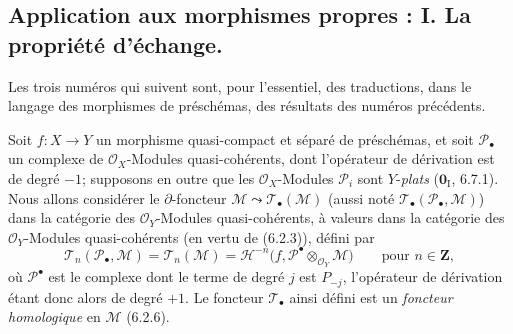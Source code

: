 \subsection{Application aux morphismes propres : I. La propriété d'échange.}
\label{subsection:III.7.7.fr}

Les trois numéros qui suivent sont, pour l'essentiel, des traductions, dans le
langage des morphismes de préschémas, des résultats des numéros précédents.

\begin{env}[7.7.1]
Soit $f:X\to Y$ un morphisme quasi-compact et séparé de préschémas, et soit
$\mathscr P_\bullet$ un complexe de $\mathscr O_X$-Modules quasi-cohérents, dont
l'opérateur de dérivation est de degré $-1$; supposons en outre que les
$\mathscr O_X$-Modules $\mathscr P_i$ sont $Y$-\emph{plats} ($\mathbf{0}_{\mathrm I}$, 6.7.1).
Nous allons considérer le $\partial$-foncteur
$\mathscr M\leadsto\mathscr T_\bullet(\mathscr M)$ (aussi noté
$\mathscr T_\bullet(\mathscr P_\bullet,\mathscr M)$) dans la catégorie des
$\mathscr O_Y$-Modules quasi-cohérents, à valeurs dans la catégorie des
$\mathscr O_Y$-Modules quasi-cohérents (en vertu de (6.2.3)), défini par
\[
  \mathscr T_n(\mathscr P_\bullet,\mathscr M)
  =\mathscr T_n(\mathscr M)
  =\mathscr H^{-n}
    \bigl(f,\mathscr P^\bullet\otimes_{\mathscr O_Y}\mathscr M\bigr)
  \qquad\text{pour }n\in\mathbf Z,
  \tag{7.7.1.1}\label{III.7.7.1.1.fr}
\]
où $\mathscr P^\bullet$ est le complexe dont le terme de degré $j$ est
$P_{-j}$, l'opérateur de dérivation étant donc alors de degré $+1$. Le foncteur
$\mathscr T_\bullet$ ainsi défini est un \emph{foncteur homologique} en
$\mathscr M$ (6.2.6).
\end{env}

